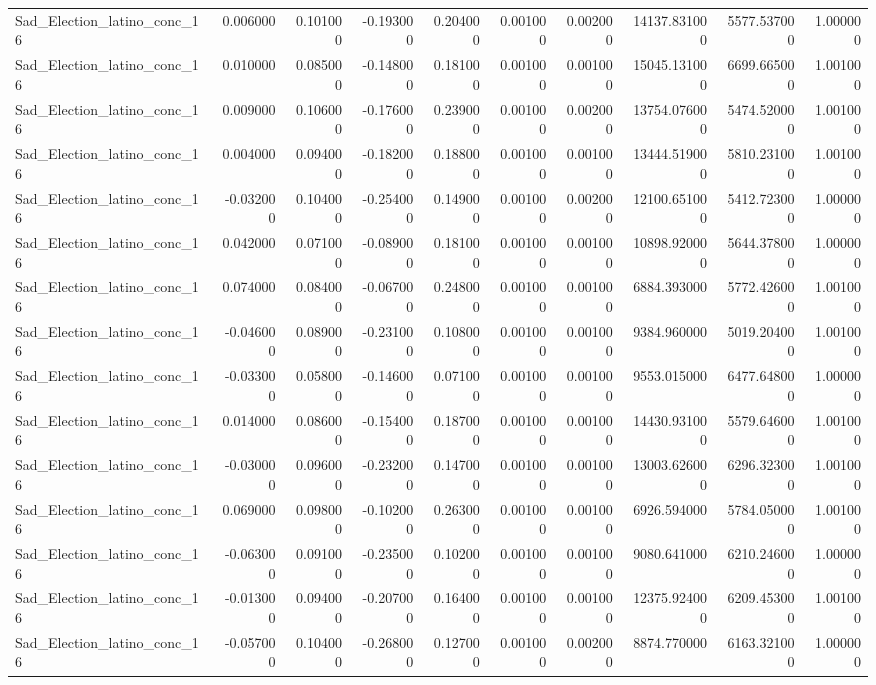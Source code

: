 \begin{table}
\begin{tabular}{lrrrrrrrrr}
Sad_Election_latino_conc_16 & 0.006000 & 0.101000 & -0.193000 & 0.204000 & 0.001000 & 0.002000 & 14137.831000 & 5577.537000 & 1.000000 \\
Sad_Election_latino_conc_16 & 0.010000 & 0.085000 & -0.148000 & 0.181000 & 0.001000 & 0.001000 & 15045.131000 & 6699.665000 & 1.001000 \\
Sad_Election_latino_conc_16 & 0.009000 & 0.106000 & -0.176000 & 0.239000 & 0.001000 & 0.002000 & 13754.076000 & 5474.520000 & 1.001000 \\
Sad_Election_latino_conc_16 & 0.004000 & 0.094000 & -0.182000 & 0.188000 & 0.001000 & 0.001000 & 13444.519000 & 5810.231000 & 1.001000 \\
Sad_Election_latino_conc_16 & -0.032000 & 0.104000 & -0.254000 & 0.149000 & 0.001000 & 0.002000 & 12100.651000 & 5412.723000 & 1.000000 \\
Sad_Election_latino_conc_16 & 0.042000 & 0.071000 & -0.089000 & 0.181000 & 0.001000 & 0.001000 & 10898.920000 & 5644.378000 & 1.000000 \\
Sad_Election_latino_conc_16 & 0.074000 & 0.084000 & -0.067000 & 0.248000 & 0.001000 & 0.001000 & 6884.393000 & 5772.426000 & 1.001000 \\
Sad_Election_latino_conc_16 & -0.046000 & 0.089000 & -0.231000 & 0.108000 & 0.001000 & 0.001000 & 9384.960000 & 5019.204000 & 1.001000 \\
Sad_Election_latino_conc_16 & -0.033000 & 0.058000 & -0.146000 & 0.071000 & 0.001000 & 0.001000 & 9553.015000 & 6477.648000 & 1.000000 \\
Sad_Election_latino_conc_16 & 0.014000 & 0.086000 & -0.154000 & 0.187000 & 0.001000 & 0.001000 & 14430.931000 & 5579.646000 & 1.001000 \\
Sad_Election_latino_conc_16 & -0.030000 & 0.096000 & -0.232000 & 0.147000 & 0.001000 & 0.001000 & 13003.626000 & 6296.323000 & 1.001000 \\
Sad_Election_latino_conc_16 & 0.069000 & 0.098000 & -0.102000 & 0.263000 & 0.001000 & 0.001000 & 6926.594000 & 5784.050000 & 1.001000 \\
Sad_Election_latino_conc_16 & -0.063000 & 0.091000 & -0.235000 & 0.102000 & 0.001000 & 0.001000 & 9080.641000 & 6210.246000 & 1.000000 \\
Sad_Election_latino_conc_16 & -0.013000 & 0.094000 & -0.207000 & 0.164000 & 0.001000 & 0.001000 & 12375.924000 & 6209.453000 & 1.001000 \\
Sad_Election_latino_conc_16 & -0.057000 & 0.104000 & -0.268000 & 0.127000 & 0.001000 & 0.002000 & 8874.770000 & 6163.321000 & 1.000000 \\

\end{tabular}
\end{table}
